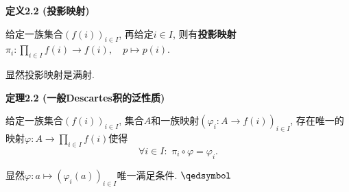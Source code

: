 \hypertarget{sec:定义2.2}{}
\noindent\textbf{定义2.2 (投影映射)}

给定一族集合$(f(i))_{i\in I}$, 再给定$i\in I$, 则有\textbf{投影映射}
$\displaystyle\pi_i:\prod_{i\in I}f(i)\to f(i),\quad p\mapsto p(i)$.

显然投影映射是满射.

\vspace{10pt}

\hypertarget{sec:定理2.2}{}
\noindent\textbf{定理2.2 (一般Descartes积的泛性质)}

给定一族集合$(f(i))_{i\in I}$, 集合$A$和一族映射$(\varphi_i:A\to f(i))_{i\in I}$,
存在唯一的映射$\displaystyle\varphi:A\to\prod_{i\in I}f(i)$使得
\[
    \forall i\in I:\,\,\pi_i\circ\varphi=\varphi_i.
\]


显然$\varphi:a\mapsto(\varphi_i(a))_{i\in I}$唯一满足条件. \hfill $\qedsymbol$


